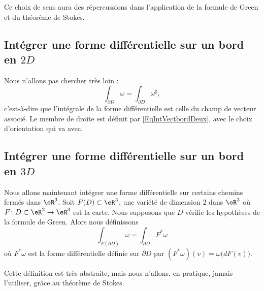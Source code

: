 Ce choix de sens aura des répercussions dans l'application de la formule de Green et du théorème de Stokes.

\subsection{Intégrer une forme différentielle sur un bord en \texorpdfstring{$ 2D$}{2D}}

Nous n'allons pas chercher très loin :
\begin{equation}
	\int_{\partial D}\omega=\int_{\partial D}\omega^{\sharp},
\end{equation}
c'est-à-dire que l'intégrale de la forme différentielle est celle du champ de vecteur associé. Le membre de droite est définit par \eqref{EqIntVectbordDeux}, avec le choix d'orientation qui va avec.

\subsection{Intégrer une forme différentielle sur un bord en \texorpdfstring{$ 3D$}{3D}}

Nous allons maintenant intégrer une forme différentielle sur certains chemins fermés dans $\eR^3$. Soit $F(D)\subset\eR^3$, une variété de dimension $2$ dans $\eR^3$ où $F\colon D\subset\eR^2\to \eR^3$ est la carte. Nous supposons que $D$ vérifie les hypothèses de la formule de Green. Alors nous définissons
\begin{equation}		\label{EqDefIntTroisForBord}
	\int_{F(\partial D)}\omega = \int_{\partial D} F^*\omega
\end{equation}
où $F^*\omega$ est la forme différentielle définie sur $\partial D$ par $(F^*\omega)(v)=\omega\big( dF(v) \big)$.

Cette définition est très abstraite, mais nous n'allons, en pratique, jamais l'utiliser, grâce au théorème de Stokes.

